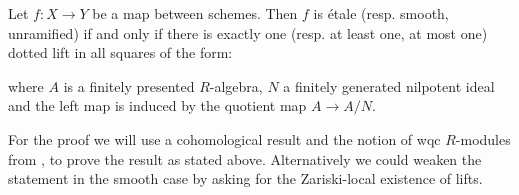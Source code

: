 \begin{remark}
  \label{connection-to-ega-definition}
  Let $f:X\to Y$ be a map between schemes.
  Then $f$ is étale (resp. smooth, unramified) if and only if there is exactly one (resp. at least one, at most one) dotted lift in all squares of the form:
  \begin{center}
  \end{center}
where $A$ is a finitely presented $R$-algebra, $N$ a finitely generated nilpotent ideal and the left map is induced by the quotient map $A\to A/N$.
\end{remark}

For the proof we will use a cohomological result and the notion of wqc $R$-modules from \cite{draft},
to prove the result as stated above. Alternatively we could weaken the statement in the smooth case by asking for the Zariski-local existence of lifts.

